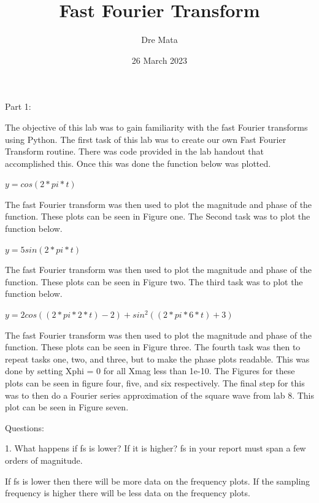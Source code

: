 \documentclass[nobib]{MSword}
\title{Fast Fourier Transform}
\author{Dre Mata}
\date{26 March 2023}
\begin{document}
\maketitle
\begin{center}
    Part 1:
\end{center}
The objective of this lab was to gain familiarity with the fast Fourier transforms using Python. The first task of this lab was to create our own Fast Fourier Transform routine. There was code provided in the lab handout that accomplished this. Once this was done the function below was plotted. 

\begin{center}
    $ y = cos(2*pi*t) $
\end{center}

The fast Fourier transform was then used to plot the magnitude and phase of the function. These plots can be seen in Figure one. The Second task was to plot the function below.

\begin{center}
    $ y = 5sin(2*pi*t) $
\end{center}

The fast Fourier transform was then used to plot the magnitude and phase of the function. These plots can be seen in Figure two. The third task was to plot the function below. 

\begin{center}
    $ y = 2cos((2*pi*2*t) - 2) + sin^2((2*pi*6*t) + 3) $
\end{center}

The fast Fourier transform was then used to plot the magnitude and phase of the function. These plots can be seen in Figure three. The fourth task was then to repeat tasks one, two, and three, but to make the phase plots readable. This was done by setting Xphi = 0 for all Xmag less than 1e-10. The Figures for these plots can be seen in figure four, five, and six respectively. The final step for this was to then do a Fourier series approximation of the square wave from lab 8. This plot can be seen in Figure seven.


\begin{center}
    Questions:
\end{center}

1. What happens if fs is lower? If it is higher? fs in your report must span a few orders of magnitude.

If fs is lower then there will be more data on the frequency plots. If the sampling frequency is higher there will be less data on the frequency plots.
\end{document}
